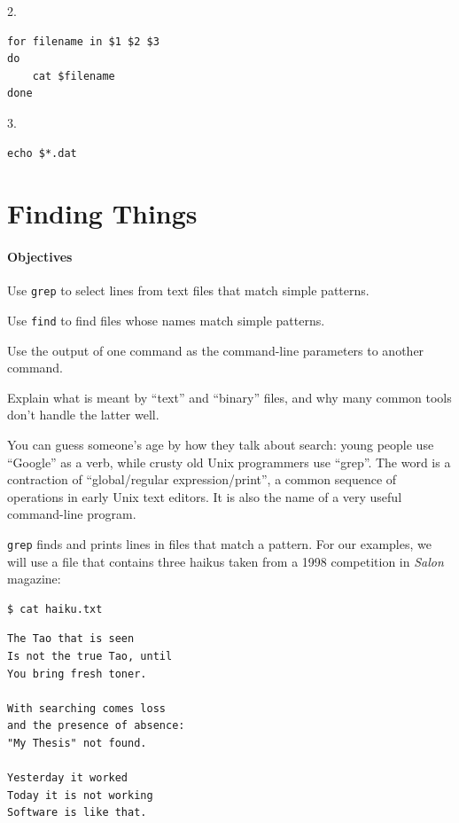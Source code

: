 \documentclass{book}
\begin{document}
2.

\begin{verbatim}
for filename in $1 $2 $3
do
    cat $filename
done
\end{verbatim}

3.

\begin{verbatim}
echo $*.dat
\end{verbatim}

\section{Finding Things}

\mbox{}\paragraph{Objectives}

\begin{swcitemize}
\item
  Use \texttt{grep} to select lines from text files that match simple
  patterns.
\item
  Use \texttt{find} to find files whose names match simple patterns.
\item
  Use the output of one command as the command-line parameters to
  another command.
\item
  Explain what is meant by ``text'' and ``binary'' files, and why many
  common tools don't handle the latter well.
\end{swcitemize}

You can guess someone's age by how they talk about search: young people
use ``Google'' as a verb, while crusty old Unix programmers use
``grep''. The word is a contraction of ``global/regular
expression/print'', a common sequence of operations in early Unix text
editors. It is also the name of a very useful command-line program.

\texttt{grep} finds and prints lines in files that match a pattern. For
our examples, we will use a file that contains three haikus taken from a
1998 competition in \emph{Salon} magazine:

\begin{verbatim}
$ cat haiku.txt
\end{verbatim}

\begin{verbatim}
The Tao that is seen
Is not the true Tao, until
You bring fresh toner.

With searching comes loss
and the presence of absence:
"My Thesis" not found.

Yesterday it worked
Today it is not working
Software is like that.
\end{verbatim}
\end{document}
